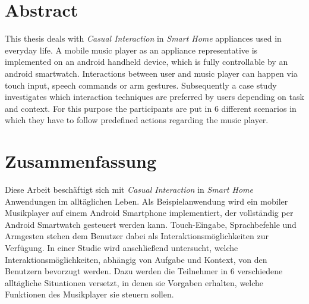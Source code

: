 \begingroup
\let\clearpage\relax
\let\cleardoublepage\relax
\let\cleardoublepage\relax

\chapter*{Abstract}
This thesis deals with \textit{Casual Interaction} in \textit{Smart Home} appliances used in everyday life. A mobile music player as an appliance representative is implemented on an android handheld device, which is fully controllable by an android smartwatch. Interactions between user and music player can happen via touch input, speech commands or arm gestures. Subsequently a case study investigates which interaction techniques are preferred by users depending on task and context. For this purpose the participants are put in 6 different scenarios in which they have to follow predefined actions regarding the music player.


\vfill

\chapter*{Zusammenfassung}
Diese Arbeit beschäftigt sich mit \textit{Casual Interaction} in \textit{Smart Home} Anwendungen im alltäglichen Leben. Als Beispielanwendung wird ein mobiler Musikplayer auf einem Android Smartphone implementiert, der vollständig per Android Smartwatch gesteuert werden kann. Touch-Eingabe, Sprachbefehle und Armgesten stehen dem Benutzer dabei als Interaktionsmöglichkeiten zur Verfügung. In einer Studie wird anschließend untersucht, welche Interaktionsmöglichkeiten, abhängig von Aufgabe und Kontext, von den Benutzern bevorzugt werden. Dazu werden die Teilnehmer in 6 verschiedene alltägliche Situationen versetzt, in denen sie Vorgaben erhalten, welche Funktionen des Musikplayer sie steuern sollen.


\endgroup			

\vfill